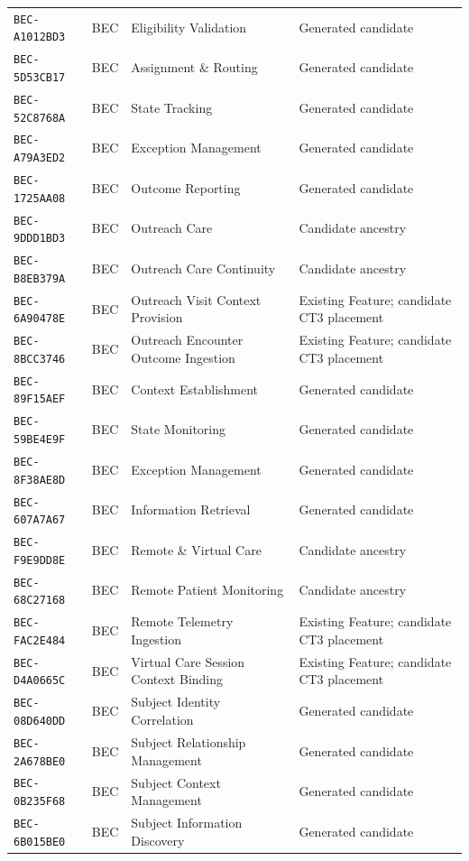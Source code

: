 \documentclass[11pt,a4paper,openany]{book}
\begin{document}
\begin{longtable}{@{}p{.19\linewidth}p{.12\linewidth}p{.39\linewidth}p{.24\linewidth}@{}}
\texttt{BEC-A1012BD3} & BEC & Eligibility Validation & Generated candidate \\
\texttt{BEC-5D53CB17} & BEC & Assignment \& Routing & Generated candidate \\
\texttt{BEC-52C8768A} & BEC & State Tracking & Generated candidate \\
\texttt{BEC-A79A3ED2} & BEC & Exception Management & Generated candidate \\
\texttt{BEC-1725AA08} & BEC & Outcome Reporting & Generated candidate \\
\texttt{BEC-9DDD1BD3} & BEC & Outreach Care & Candidate ancestry \\
\texttt{BEC-B8EB379A} & BEC & Outreach Care Continuity & Candidate ancestry \\
\texttt{BEC-6A90478E} & BEC & Outreach Visit Context Provision & Existing Feature; candidate CT3 placement \\
\texttt{BEC-8BCC3746} & BEC & Outreach Encounter Outcome Ingestion & Existing Feature; candidate CT3 placement \\
\texttt{BEC-89F15AEF} & BEC & Context Establishment & Generated candidate \\
\texttt{BEC-59BE4E9F} & BEC & State Monitoring & Generated candidate \\
\texttt{BEC-8F38AE8D} & BEC & Exception Management & Generated candidate \\
\texttt{BEC-607A7A67} & BEC & Information Retrieval & Generated candidate \\
\texttt{BEC-F9E9DD8E} & BEC & Remote \& Virtual Care & Candidate ancestry \\
\texttt{BEC-68C27168} & BEC & Remote Patient Monitoring & Candidate ancestry \\
\texttt{BEC-FAC2E484} & BEC & Remote Telemetry Ingestion & Existing Feature; candidate CT3 placement \\
\texttt{BEC-D4A0665C} & BEC & Virtual Care Session Context Binding & Existing Feature; candidate CT3 placement \\
\texttt{BEC-08D640DD} & BEC & Subject Identity Correlation & Generated candidate \\
\texttt{BEC-2A678BE0} & BEC & Subject Relationship Management & Generated candidate \\
\texttt{BEC-0B235F68} & BEC & Subject Context Management & Generated candidate \\
\texttt{BEC-6B015BE0} & BEC & Subject Information Discovery & Generated candidate \\

\end{longtable}
\end{document}
